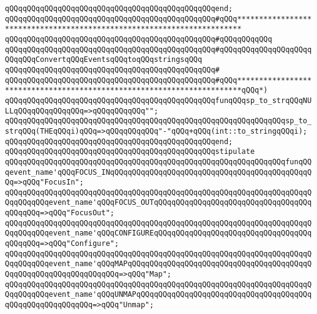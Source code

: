 \verb|qQQqqQQqqQQqqQQqqQQqqQQqqQQqqQQqqQQqqQQqqQQqqQQqend;|\newline
\newline
\newline
\verb|qQQqqQQqqQQqqQQqqQQqqQQqqQQqqQQqqQQqqQQqqQQqqQQq#qQQq***********************************************************************|\newline
\verb|qQQqqQQqqQQqqQQqqQQqqQQqqQQqqQQqqQQqqQQqqQQqqQQq#qQQqqQQqqQQq|\newline
\verb|qQQqqQQqqQQqqQQqqQQqqQQqqQQqqQQqqQQqqQQqqQQqqQQq#qQQqqQQqqQQqqQQqqQQqqQQqqQQqConvertqQQqEventsqQQqtoqQQqstringsqQQq|\newline
\verb|qQQqqQQqqQQqqQQqqQQqqQQqqQQqqQQqqQQqqQQqqQQqqQQq#|\newline
\verb|qQQqqQQqqQQqqQQqqQQqqQQqqQQqqQQqqQQqqQQqqQQqqQQq#qQQq***********************************************************************qQQq*)|\newline
\newline
\verb|qQQqqQQqqQQqqQQqqQQqqQQqqQQqqQQqqQQqqQQqqQQqqQQqfunqQQqsp_to_strqQQqNULLqQQqqQQqqQQqqQQq=>qQQqqQQqqQQq"";|\newline
\verb|qQQqqQQqqQQqqQQqqQQqqQQqqQQqqQQqqQQqqQQqqQQqqQQqqQQqqQQqqQQqqQQqsp_to_strqQQq(THEqQQqi)qQQq=>qQQqqQQqqQQq"-"qQQq+qQQq(int::to_stringqQQqi);|\newline
\verb|qQQqqQQqqQQqqQQqqQQqqQQqqQQqqQQqqQQqqQQqqQQqqQQqend;|\newline
\newline
\verb|qQQqqQQqqQQqqQQqqQQqqQQqqQQqqQQqqQQqqQQqqQQqqQQqstipulate|\newline
\verb|qQQqqQQqqQQqqQQqqQQqqQQqqQQqqQQqqQQqqQQqqQQqqQQqqQQqqQQqqQQqqQQqfunqQQqevent_name'qQQqFOCUS_INqQQqqQQqqQQqqQQqqQQqqQQqqQQqqQQqqQQqqQQqqQQqqQQq=>qQQq"FocusIn";|\newline
\verb|qQQqqQQqqQQqqQQqqQQqqQQqqQQqqQQqqQQqqQQqqQQqqQQqqQQqqQQqqQQqqQQqqQQqqQQqqQQqqQQqevent_name'qQQqFOCUS_OUTqQQqqQQqqQQqqQQqqQQqqQQqqQQqqQQqqQQqqQQqqQQq=>qQQq"FocusOut";|\newline
\verb|qQQqqQQqqQQqqQQqqQQqqQQqqQQqqQQqqQQqqQQqqQQqqQQqqQQqqQQqqQQqqQQqqQQqqQQqqQQqqQQqevent_name'qQQqCONFIGUREqQQqqQQqqQQqqQQqqQQqqQQqqQQqqQQqqQQqqQQqqQQq=>qQQq"Configure";|\newline
\verb|qQQqqQQqqQQqqQQqqQQqqQQqqQQqqQQqqQQqqQQqqQQqqQQqqQQqqQQqqQQqqQQqqQQqqQQqqQQqqQQqevent_name'qQQqMAPqQQqqQQqqQQqqQQqqQQqqQQqqQQqqQQqqQQqqQQqqQQqqQQqqQQqqQQqqQQqqQQqqQQq=>qQQq"Map";|\newline
\verb|qQQqqQQqqQQqqQQqqQQqqQQqqQQqqQQqqQQqqQQqqQQqqQQqqQQqqQQqqQQqqQQqqQQqqQQqqQQqqQQqevent_name'qQQqUNMAPqQQqqQQqqQQqqQQqqQQqqQQqqQQqqQQqqQQqqQQqqQQqqQQqqQQqqQQqqQQq=>qQQq"Unmap";|\newline
